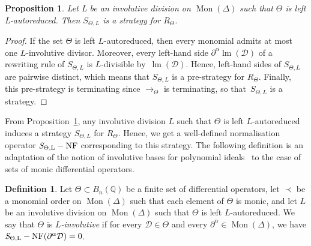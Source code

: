 \documentclass[10pt]{easychair}
\newtheorem{proposition}[theorem]{Proposition}
\theoremstyle{definition}
\newtheorem{definition}[theorem]{Definition}
\newcommand\D{\mathcal{D}}
\DeclareMathOperator{\lm}{lm}
\newcommand\Q{\mathbb{Q}}
\newcommand\Weyl[1]{B_{#1}(\Q)}
\newcommand\monBasis{\Mon(\Delta)}
\DeclareMathOperator{\Mon}{Mon}
\newcommand\rewTheta{\to_\Theta}
\newcommand\RTheta{R_{\Theta}}
\newcommand\SThetaL{S_{\Theta,L}}
\DeclareMathOperator{\SThetaLNF}{{\it S}_{\Theta,L}-NF}
\begin{document}
\begin{proposition}\label{prop:involutive_strategy}
  Let L be an involutive division on $\Mon(\Delta)$ such that $\Theta$ is
  left L-autoreduced. Then $\SThetaL$ is a strategy for $\RTheta$.  
\end{proposition}

\begin{proof}
  If the set $\Theta$ is left $L$-autoreduced, then every monomial admits
  at most one $L$-involutive divisor. Moreover, every left-hand side
  $\partial^\alpha\lm(\D)$ of a rewriting rule of $\SThetaL$ is
  $L$-divisible by~$\lm(\D)$. Hence, left-hand sides of $\SThetaL$ are
  pairwise distinct, which means that $\SThetaL$ is a pre-strategy for
  $\RTheta$. Finally, this pre-strategy is terminating since $\rewTheta$
  is terminating, so that~$\SThetaL$ is a strategy.
\end{proof}
\smallskip


From Proposition~\ref{prop:involutive_strategy}, any involutive division
$L$ such that $\Theta$ is left $L$-autoreduced induces a strategy
$\SThetaL$ for $\RTheta$. Hence, we get a well-defined normalisation
operator $\SThetaLNF$ corresponding to this strategy. The following
definition is an adaptation of the notion of involutive bases for
polynomial ideals~\cite{MR1627129} to the case of sets of monic
differential operators.
\smallskip

\begin{definition}
  Let $\Theta\subset\Weyl{n}$ be a finite set of differential operators,
  let $\prec$ be a monomial order on $\monBasis$ such that each element
  of $\Theta$ is monic, and let $L$ be an involutive division on
  $\Mon(\Delta)$ such that $\Theta$ is left $L$-autoreduced. We say that
  $\Theta$ is {\em $L$-involutive} if for every $\D\in\Theta$ and every
  $\partial^\alpha\in\Mon(\Delta)$, we have
  $\SThetaLNF(\partial^\alpha\D)=0$. 
\end{definition}
\smallskip
\end{document}
